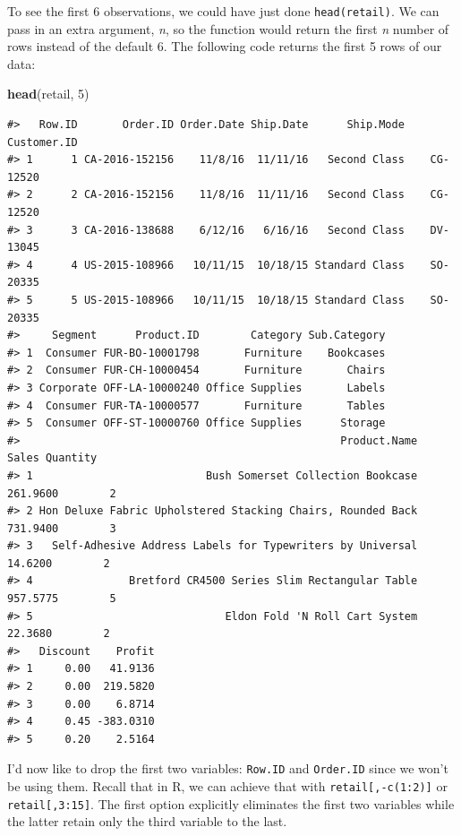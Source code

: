 \documentclass[]{article}
\newenvironment{Shaded}{\begin{snugshade}}{\end{snugshade}}
\newcommand{\DecValTok}[1]{\textcolor[rgb]{0.00,0.00,0.81}{#1}}
\newcommand{\KeywordTok}[1]{\textcolor[rgb]{0.13,0.29,0.53}{\textbf{#1}}}
\newcommand{\NormalTok}[1]{#1}
\begin{document}
To see the first 6 observations, we could have just done
\texttt{head(retail)}. We can pass in an extra argument, \emph{n}, so
the function would return the first \emph{n} number of rows instead of
the default 6. The following code returns the first 5 rows of our data:

\begin{Shaded}
\begin{Highlighting}[]
\KeywordTok{head}\NormalTok{(retail, }\DecValTok{5}\NormalTok{)}
\end{Highlighting}
\end{Shaded}

\begin{verbatim}
#>   Row.ID       Order.ID Order.Date Ship.Date      Ship.Mode Customer.ID
#> 1      1 CA-2016-152156    11/8/16  11/11/16   Second Class    CG-12520
#> 2      2 CA-2016-152156    11/8/16  11/11/16   Second Class    CG-12520
#> 3      3 CA-2016-138688    6/12/16   6/16/16   Second Class    DV-13045
#> 4      4 US-2015-108966   10/11/15  10/18/15 Standard Class    SO-20335
#> 5      5 US-2015-108966   10/11/15  10/18/15 Standard Class    SO-20335
#>     Segment      Product.ID        Category Sub.Category
#> 1  Consumer FUR-BO-10001798       Furniture    Bookcases
#> 2  Consumer FUR-CH-10000454       Furniture       Chairs
#> 3 Corporate OFF-LA-10000240 Office Supplies       Labels
#> 4  Consumer FUR-TA-10000577       Furniture       Tables
#> 5  Consumer OFF-ST-10000760 Office Supplies      Storage
#>                                                  Product.Name    Sales Quantity
#> 1                           Bush Somerset Collection Bookcase 261.9600        2
#> 2 Hon Deluxe Fabric Upholstered Stacking Chairs, Rounded Back 731.9400        3
#> 3   Self-Adhesive Address Labels for Typewriters by Universal  14.6200        2
#> 4               Bretford CR4500 Series Slim Rectangular Table 957.5775        5
#> 5                              Eldon Fold 'N Roll Cart System  22.3680        2
#>   Discount    Profit
#> 1     0.00   41.9136
#> 2     0.00  219.5820
#> 3     0.00    6.8714
#> 4     0.45 -383.0310
#> 5     0.20    2.5164
\end{verbatim}

I'd now like to drop the first two variables: \texttt{Row.ID} and
\texttt{Order.ID} since we won't be using them. Recall that in R, we can
achieve that with \texttt{retail{[},-c(1:2){]}} or
\texttt{retail{[},3:15{]}}. The first option explicitly eliminates the
first two variables while the latter retain only the third variable to
the last.
\end{document}
